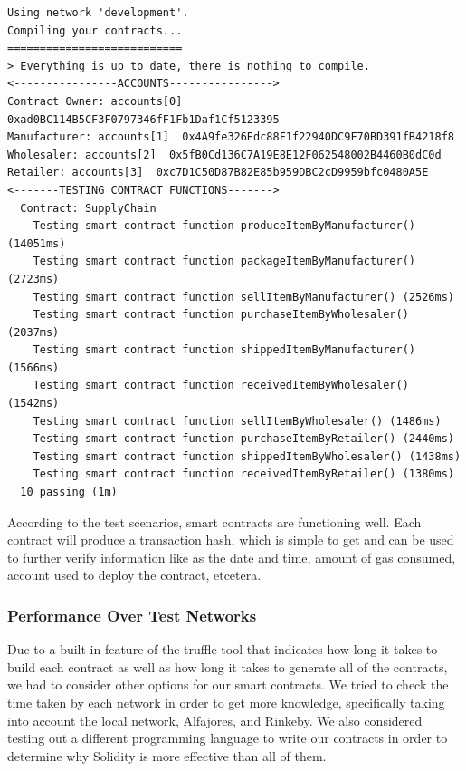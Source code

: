 \begin{lstlisting}[numbers=none, basicstyle=\ttfamily\tiny]
Using network 'development'.
Compiling your contracts...
===========================
> Everything is up to date, there is nothing to compile.
<----------------ACCOUNTS---------------->
Contract Owner: accounts[0]  0xad0BC114B5CF3F0797346fF1Fb1Daf1Cf5123395
Manufacturer: accounts[1]  0x4A9fe326Edc88F1f22940DC9F70BD391fB4218f8
Wholesaler: accounts[2]  0x5fB0Cd136C7A19E8E12F062548002B4460B0dC0d
Retailer: accounts[3]  0xc7D1C50D87B82E85b959DBC2cD9959bfc0480A5E
<-------TESTING CONTRACT FUNCTIONS------->
  Contract: SupplyChain
    Testing smart contract function produceItemByManufacturer() (14051ms)
    Testing smart contract function packageItemByManufacturer() (2723ms)
    Testing smart contract function sellItemByManufacturer() (2526ms)
    Testing smart contract function purchaseItemByWholesaler() (2037ms)
    Testing smart contract function shippedItemByManufacturer() (1566ms)
    Testing smart contract function receivedItemByWholesaler() (1542ms)
    Testing smart contract function sellItemByWholesaler() (1486ms)
    Testing smart contract function purchaseItemByRetailer() (2440ms)
    Testing smart contract function shippedItemByWholesaler() (1438ms)
    Testing smart contract function receivedItemByRetailer() (1380ms)
  10 passing (1m)
\end{lstlisting}

\vspace{.5cm}

According to the test scenarios, smart contracts are functioning well. Each contract will produce a transaction hash, which is simple to get and can be used to further verify information like as the date and time, amount of gas consumed, account used to deploy the contract, etcetera.

\subsubsection{Performance Over Test Networks}

Due to a built-in feature of the truffle tool that indicates how long it takes to build each contract as well as how long it takes to generate all of the contracts, we had to consider other options for our smart contracts. We tried to check the time taken by each network in order to get more knowledge, specifically taking into account the local network, Alfajores, and Rinkeby. We also considered testing out a different programming language to write our contracts in order to determine why Solidity is more effective than all of them.

